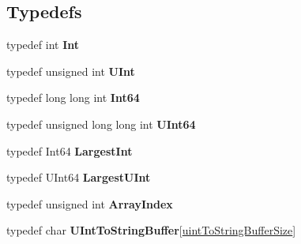 \subsection*{Typedefs}
\begin{DoxyCompactItemize}
\item 
\mbox{\label{namespace_json_a08122e8005b706d982e48cca1e2119c7}} 
typedef int {\bfseries Int}
\item 
\mbox{\label{namespace_json_a800fb90eb6ee8d5d62b600c06f87f7d4}} 
typedef unsigned int {\bfseries U\+Int}
\item 
\mbox{\label{namespace_json_ab7b47d2905da3b4ae60e4e800ec9ae5f}} 
typedef long long int {\bfseries Int64}
\item 
\mbox{\label{namespace_json_a01f20bce8f8229f38ff890168c0e6452}} 
typedef unsigned long long int {\bfseries U\+Int64}
\item 
\mbox{\label{namespace_json_a218d880af853ce786cd985e82571d297}} 
typedef Int64 {\bfseries Largest\+Int}
\item 
\mbox{\label{namespace_json_ae202ecad69725e23443f465e257456d0}} 
typedef U\+Int64 {\bfseries Largest\+U\+Int}
\item 
\mbox{\label{namespace_json_a8048e741f2177c3b5d9ede4a5b8c53c2}} 
typedef unsigned int {\bfseries Array\+Index}
\item 
\mbox{\label{namespace_json_a602bcf69c2042fb61c3b243cb16f04ca}} 
typedef char {\bfseries U\+Int\+To\+String\+Buffer}\mbox{[}\hyperlink{namespace_json_a0c5f614b019f20b4598dcaec09d9e820ae4f2008c7919f20d81286121d1374424}{uint\+To\+String\+Buffer\+Size}\mbox{]}
\end{DoxyCompactItemize}
